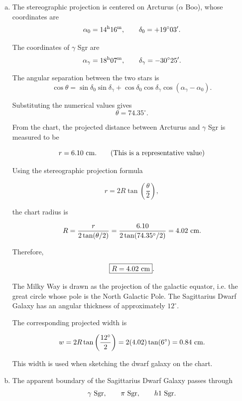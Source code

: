 \documentclass[a4paper,12pt]{extarticle}
\begin{document}
\begin{sol}
	\footnotesize
	
	\begin{enumerate}[a.]
		
		\item The stereographic projection is centered on Arcturus (\(\alpha\) Boo), whose coordinates are
		\[
		\alpha_0=14^{\rm h}16^{\rm m},
		\qquad
		\delta_0=+19^\circ03'.
		\]
		
		The coordinates of \(\gamma\) Sgr are
		\[
		\alpha_\gamma=18^{\rm h}07^{\rm m},
		\qquad
		\delta_\gamma=-30^\circ25'.
		\]
		
		The angular separation between the two stars is
		\[
		\cos\theta
		=
		\sin\delta_0\sin\delta_\gamma
		+
		\cos\delta_0\cos\delta_\gamma
		\cos(\alpha_\gamma-\alpha_0).
		\]
		
		Substituting the numerical values gives
		\[
		\theta
		=
		74.35^\circ.
		\]
		
		From the chart, the projected distance between Arcturus and \(\gamma\) Sgr is measured to be
		
		\[
		r=6.10\ {\rm cm}. \tag{This is a representative value}
		\]
		
		Using the stereographic projection formula
		
		\[
		r
		=
		2R\tan\left(\frac{\theta}{2}\right),
		\]
		
		the chart radius is
		
		\[
		R
		=
		\frac{r}
		{2\tan(\theta/2)}
		=
		\frac{6.10}
		{2\tan(74.35^\circ/2)}
		=
		4.02\ {\rm cm}.
		\]
		
		Therefore,
		
		\[
		\boxed{R=4.02\ {\rm cm}}.
		\]
		
		The Milky Way is drawn as the projection of the galactic equator, i.e. the great circle whose pole is the North Galactic Pole. The Sagittarius Dwarf Galaxy has an angular thickness of approximately $	12^\circ.$
		
		The corresponding projected width is
		
		\[
		w
		=
		2R\tan\left(\frac{12^\circ}{2}\right)
		=
		2(4.02)\tan(6^\circ)
		=
		0.84\ {\rm cm}.
		\]
		
		This width is used when sketching the dwarf galaxy on the chart.
		
		\item
		
		The apparent boundary of the Sagittarius Dwarf Galaxy passes through
		\[
		\gamma{\rm\ Sgr},
		\qquad
		\pi{\rm\ Sgr},
		\qquad
		h1{\rm\ Sgr}.
		\]
		

\end{enumerate}
\end{sol}
\end{document}
